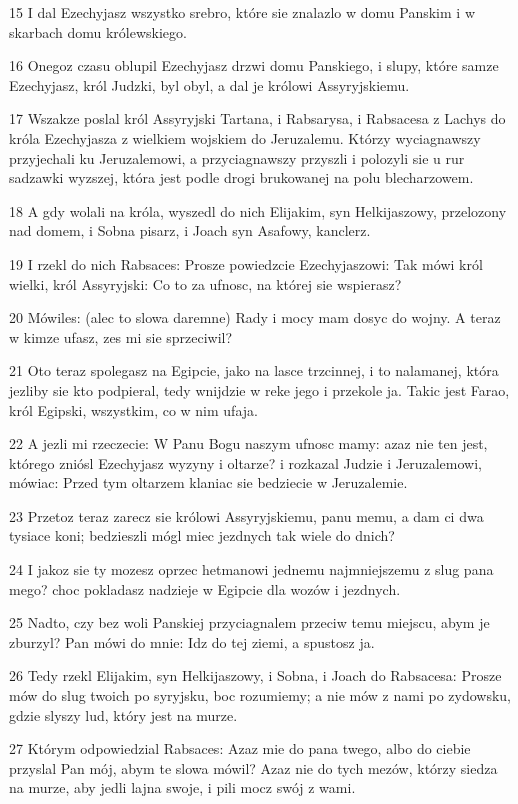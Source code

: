 \par 15 I dal Ezechyjasz wszystko srebro, które sie znalazlo w domu Panskim i w skarbach domu królewskiego.
\par 16 Onegoz czasu oblupil Ezechyjasz drzwi domu Panskiego, i slupy, które samze Ezechyjasz, król Judzki, byl obyl, a dal je królowi Assyryjskiemu.
\par 17 Wszakze poslal król Assyryjski Tartana, i Rabsarysa, i Rabsacesa z Lachys do króla Ezechyjasza z wielkiem wojskiem do Jeruzalemu. Którzy wyciagnawszy przyjechali ku Jeruzalemowi, a przyciagnawszy przyszli i polozyli sie u rur sadzawki wyzszej, która jest podle drogi brukowanej na polu blecharzowem.
\par 18 A gdy wolali na króla, wyszedl do nich Elijakim, syn Helkijaszowy, przelozony nad domem, i Sobna pisarz, i Joach syn Asafowy, kanclerz.
\par 19 I rzekl do nich Rabsaces: Prosze powiedzcie Ezechyjaszowi: Tak mówi król wielki, król Assyryjski: Co to za ufnosc, na której sie wspierasz?
\par 20 Mówiles: (alec to slowa daremne) Rady i mocy mam dosyc do wojny. A teraz w kimze ufasz, zes mi sie sprzeciwil?
\par 21 Oto teraz spolegasz na Egipcie, jako na lasce trzcinnej, i to nalamanej, która jezliby sie kto podpieral, tedy wnijdzie w reke jego i przekole ja. Takic jest Farao, król Egipski, wszystkim, co w nim ufaja.
\par 22 A jezli mi rzeczecie: W Panu Bogu naszym ufnosc mamy: azaz nie ten jest, którego zniósl Ezechyjasz wyzyny i oltarze? i rozkazal Judzie i Jeruzalemowi, mówiac: Przed tym oltarzem klaniac sie bedziecie w Jeruzalemie.
\par 23 Przetoz teraz zarecz sie królowi Assyryjskiemu, panu memu, a dam ci dwa tysiace koni; bedzieszli mógl miec jezdnych tak wiele do dnich?
\par 24 I jakoz sie ty mozesz oprzec hetmanowi jednemu najmniejszemu z slug pana mego? choc pokladasz nadzieje w Egipcie dla wozów i jezdnych.
\par 25 Nadto, czy bez woli Panskiej przyciagnalem przeciw temu miejscu, abym je zburzyl? Pan mówi do mnie: Idz do tej ziemi, a spustosz ja.
\par 26 Tedy rzekl Elijakim, syn Helkijaszowy, i Sobna, i Joach do Rabsacesa: Prosze mów do slug twoich po syryjsku, boc rozumiemy; a nie mów z nami po zydowsku, gdzie slyszy lud, który jest na murze.
\par 27 Którym odpowiedzial Rabsaces: Azaz mie do pana twego, albo do ciebie przyslal Pan mój, abym te slowa mówil? Azaz nie do tych mezów, którzy siedza na murze, aby jedli lajna swoje, i pili mocz swój z wami.

